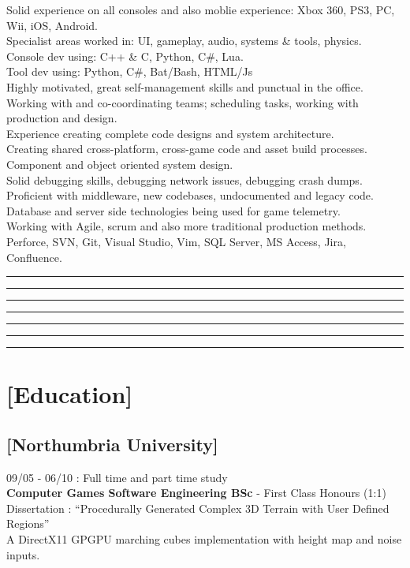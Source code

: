 \documentclass[a4paper]{res}
\newcommand{\setrule}[1]{\rule{#1}{1mm}}
\newcommand{\fibrule}[2]{ \hspace{#1}  \setrule{#2} \setrule{21mm} \setrule{13mm} \setrule{8mm} \setrule{5mm} \setrule{3mm} \setrule{2mm}  \vspace{-.52in} }
\begin{document}
\begin{resume}
Solid experience on all consoles and also moblie experience: Xbox 360, PS3, PC, Wii, iOS, Android. \\
Specialist areas worked in: UI, gameplay, audio, systems \& tools, physics. \\
Console dev using: C++ \& C, Python, C\#, Lua. \\
Tool dev using: Python, C\#, Bat/Bash, HTML/Js \\
Highly motivated, great self-management skills and punctual in the office. \\
Working with and co-coordinating teams; scheduling tasks, working with production and design.  \\
Experience creating complete code designs and system architecture. \\
Creating shared cross-platform, cross-game code and asset build processes. \\
Component and object oriented system design. \\
Solid debugging skills, debugging network issues, debugging crash dumps. \\
Proficient with middleware, new codebases, undocumented and legacy code.  \\
Database and server side technologies being used for game telemetry.\\
Working with Agile, scrum and also more traditional production methods. \\
Perforce, SVN, Git, Visual Studio, Vim, SQL Server, MS Access, Jira, Confluence.


\fibrule{0.9in}{3.0in}
\section{[Education]} 

\vspace{-.12in}

\subsection{[Northumbria University]} 09/05 - 06/10 : Full time and part time study\\
{\bf Computer Games Software Engineering BSc} -  First Class Honours (1:1) \\
Dissertation : ``Procedurally Generated Complex 3D Terrain with User Defined Regions'' \\
A DirectX11 GPGPU marching cubes implementation with height map and noise inputs.


\end{resume}
\end{document}
